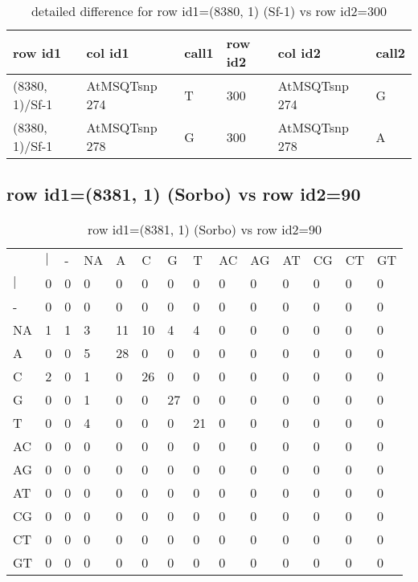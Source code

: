 \begin{center}
\begin{longtable}{|l|l|l|l|l|l|}
\caption{detailed difference for row id1=(8380, 1) (Sf-1) vs row id2=300} \label{table_dm429}\\
\hline
row id1&col id1&call1&row id2&col id2&call2\\
\hline
(8380, 1)/Sf-1&AtMSQTsnp 274&T&300&AtMSQTsnp 274&G\\
(8380, 1)/Sf-1&AtMSQTsnp 278&G&300&AtMSQTsnp 278&A\\
\hline
\end{longtable}
\end{center}

\subsection{row id1=(8381, 1) (Sorbo) vs row id2=90}
\begin{center}
\begin{longtable}{|l|l|l|l|l|l|l|l|l|l|l|l|l|l|}
\caption{row id1=(8381, 1) (Sorbo) vs row id2=90} \label{table_dm430}\\
\hline
\\
\hline
&$|$&-&NA&A&C&G&T&AC&AG&AT&CG&CT&GT\\
$|$&0&0&0&0&0&0&0&0&0&0&0&0&0\\
-&0&0&0&0&0&0&0&0&0&0&0&0&0\\
NA&1&1&3&11&10&4&4&0&0&0&0&0&0\\
A&0&0&5&28&0&0&0&0&0&0&0&0&0\\
C&2&0&1&0&26&0&0&0&0&0&0&0&0\\
G&0&0&1&0&0&27&0&0&0&0&0&0&0\\
T&0&0&4&0&0&0&21&0&0&0&0&0&0\\
AC&0&0&0&0&0&0&0&0&0&0&0&0&0\\
AG&0&0&0&0&0&0&0&0&0&0&0&0&0\\
AT&0&0&0&0&0&0&0&0&0&0&0&0&0\\
CG&0&0&0&0&0&0&0&0&0&0&0&0&0\\
CT&0&0&0&0&0&0&0&0&0&0&0&0&0\\
GT&0&0&0&0&0&0&0&0&0&0&0&0&0\\
\hline
\end{longtable}
\end{center}

